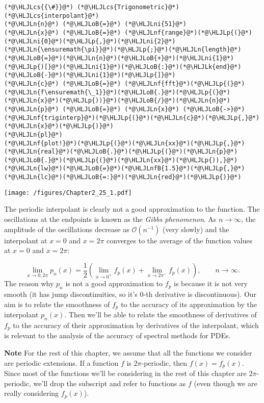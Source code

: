 \documentclass[12pt,a4paper]{article}
\newcommand{\HLJLk}[1]{\textcolor[RGB]{148,91,176}{\textbf{#1}}}
\newcommand{\HLJLn}[1]{#1}
\newcommand{\HLJLnf}[1]{\textcolor[RGB]{66,102,213}{#1}}
\newcommand{\HLJLnfB}[1]{\textcolor[RGB]{59,151,46}{#1}}
\newcommand{\HLJLni}[1]{\textcolor[RGB]{59,151,46}{#1}}
\newcommand{\HLJLoB}[1]{\textcolor[RGB]{102,102,102}{\textbf{#1}}}
\newcommand{\HLJLp}[1]{#1}
\newcommand{\HLJLcs}[1]{\textcolor[RGB]{153,153,119}{\textit{#1}}}
\begin{document}
\begin{lstlisting}
(*@\HLJLcs{{\#}}@*) (*@\HLJLcs{Trigonometric}@*) (*@\HLJLcs{interpolant}@*)
(*@\HLJLn{n}@*) (*@\HLJLoB{=}@*) (*@\HLJLni{51}@*)
(*@\HLJLn{x}@*) (*@\HLJLoB{=}@*) (*@\HLJLnf{range}@*)(*@\HLJLp{(}@*)(*@\HLJLni{0}@*)(*@\HLJLp{,}@*)(*@\HLJLni{2}@*)(*@\HLJLn{\ensuremath{\pi}}@*)(*@\HLJLp{;}@*)(*@\HLJLn{length}@*)(*@\HLJLoB{=}@*)(*@\HLJLn{n}@*)(*@\HLJLoB{+}@*)(*@\HLJLni{1}@*)(*@\HLJLp{)[}@*)(*@\HLJLni{1}@*)(*@\HLJLoB{:}@*)(*@\HLJLk{end}@*)(*@\HLJLoB{-}@*)(*@\HLJLni{1}@*)(*@\HLJLp{]}@*)
(*@\HLJLn{c}@*) (*@\HLJLoB{=}@*) (*@\HLJLnf{fft}@*)(*@\HLJLp{(}@*)(*@\HLJLn{f\ensuremath{\_1}}@*)(*@\HLJLoB{.}@*)(*@\HLJLp{(}@*)(*@\HLJLn{x}@*)(*@\HLJLp{))}@*)(*@\HLJLoB{/}@*)(*@\HLJLn{n}@*)
(*@\HLJLn{p}@*) (*@\HLJLoB{=}@*) (*@\HLJLn{x}@*) (*@\HLJLoB{->}@*) (*@\HLJLnf{triginterp}@*)(*@\HLJLp{(}@*)(*@\HLJLn{c}@*)(*@\HLJLp{,}@*) (*@\HLJLn{x}@*)(*@\HLJLp{)}@*)
(*@\HLJLn{pl}@*)  
(*@\HLJLnf{plot!}@*)(*@\HLJLp{(}@*)(*@\HLJLn{xx}@*)(*@\HLJLp{,}@*)(*@\HLJLn{real}@*)(*@\HLJLoB{.}@*)(*@\HLJLp{(}@*)(*@\HLJLn{p}@*)(*@\HLJLoB{.}@*)(*@\HLJLp{(}@*)(*@\HLJLn{xx}@*)(*@\HLJLp{)),}@*)(*@\HLJLn{lw}@*)(*@\HLJLoB{=}@*)(*@\HLJLnfB{1.5}@*)(*@\HLJLp{,}@*)(*@\HLJLn{lc}@*)(*@\HLJLoB{=:}@*)(*@\HLJLn{red}@*)(*@\HLJLp{)}@*)
\end{lstlisting}

\texttt{[image: /figures/Chapter2\_25\_1.pdf]}

The periodic interpolant is clearly not a good approximation to the function.  The oscillations at the endpoints is known as the \emph{Gibbs phenomenon}.  As $n \to \infty$, the amplitude of the oscillations decrease as $\mathcal{O}(n^{-1})$ (very slowly) and the interpolant at $x=0$ and $x =2\pi$ converges to the average of the function values at  $x=0$ and $x =2\pi$:

\[
\lim_{x\to 0, 2\pi}p_n(x) = \frac{1}{2}\left(\lim_{x \to 0^{+}}f_p(x) + \lim_{x \to 2\pi^{-}}f_p(x)\right), \qquad n \to \infty.
\]
The reason why $p_n$ is not a good approximation to $f_p$ is because it is not very smooth (it has jump discontinuities, so it's $0$-th derivative is discontinuous). Our aim is to relate the smoothness of $f_p$ to the accuracy of its approximation by the interpolant $p_n(x)$.  Then we'll be able to relate the smoothness of derivatives of $f_p$ to the accuracy of their approximation by derivatives of the interpolant, which is relevant to the analysis of the accuracy of spectral methods for PDEs.

\textbf{Note} For the rest of this chapter, we assume that all the functions we consider are periodic extensions. If a function $f$ is $2\pi$-periodic, then $f(x) = f_p(x)$. Since most of the functions we'll be considering in the rest of this chapter are $2\pi$-periodic, we'll drop the subscript and refer to functions as $f$ (even though we are really considering $f_p(x)$).
\end{document}
